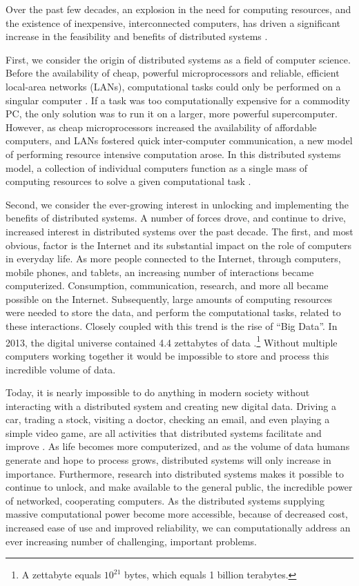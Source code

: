 Over the past few decades, an explosion in the need for computing resources,
and the existence of inexpensive, interconnected computers, has
driven a significant increase in the feasibility and benefits of distributed
systems \cite{distributed-systems-principles-and-paradigms}.

First, we consider the origin of distributed systems as a field of computer
science. Before the availability of cheap, powerful microprocessors and reliable,
efficient local-area networks (LANs), computational tasks could only be
performed on a singular computer
\cite{distributed-systems-principles-and-paradigms}. If a task was too
computationally expensive for a commodity PC, the only solution was to run
it on a larger, more powerful supercomputer. However, as cheap microprocessors
increased the availability of affordable computers, and LANs fostered quick inter-computer
communication, a new
model of performing resource intensive computation arose.
In this distributed systems model, a collection of individual
computers function as a single mass of computing resources
to solve a given computational task
\cite{distributed-systems-principles-and-paradigms}.

Second, we consider the ever-growing interest in unlocking and implementing the
benefits of distributed systems. A number of forces drove, and continue to drive,
increased interest in distributed systems over
the past decade. The first, and most obvious, factor is the Internet and its
substantial impact on the role of computers in everyday life.
As more people connected to the Internet, through computers,
mobile phones, and tablets, an increasing number of interactions became
computerized. Consumption, communication, research, and more all
became possible on the Internet. Subsequently, large amounts of computing resources
were needed to store the data, and perform the computational tasks, related to these
interactions. Closely coupled with this trend is the rise of ``Big Data''.
In 2013, the digital universe contained 4.4 zettabytes of data
\cite{the-digital-universe-of-opportunities}.\footnote{A
  zettabyte equals $10^{21}$ bytes, which equals 1 billion
terabytes.} Without
multiple computers working together it would be impossible to store and process
this incredible volume of data.

Today, it is nearly impossible to do
anything in modern society without interacting with a distributed system and
creating new digital data. Driving a car, trading a stock, visiting a doctor,
checking an email, and even playing a simple video game, are all activities that
distributed systems facilitate and improve \cite{distributed-systems-concepts-and-design}.
As life becomes more
computerized, and as the volume of data humans generate and hope to process
grows, distributed systems will only increase in importance.
Furthermore, research into distributed systems makes it possible to
continue to unlock, and make available to the general public,
the incredible power of networked, cooperating computers. As the distributed systems
supplying massive computational power become more
accessible, because of decreased cost, increased ease of use and
improved reliability, we can
computationally address an ever increasing number of challenging, important problems.

